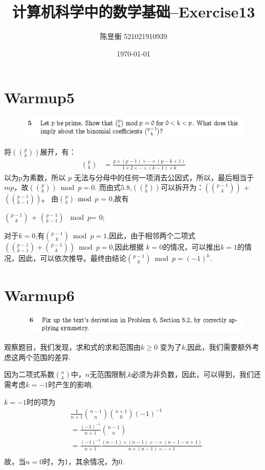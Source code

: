 \documentclass[]{article}
\title{计算机科学中的数学基础--Exercise13}
\author{陈昱衡 521021910939}
\date{\today}
\begin{document}
\maketitle


\section*{Warmup5}
\begin{figure}[H]
    
    \includegraphics[scale = 0.6]{2023-03-27-17-10-45.png}
\end{figure}
将$\left( \binom{p}{k}\right)$展开，有：
\begin{align}
    \binom{p}{k}&=\frac{p \times (p-1) \times \cdots \times (p-k+1)}{1 \times 2 \times \cdots \times  (k-1) \times k}  
\end{align}
以为p为素数，所以 $p$ 无法与分母中的任何一项消去公因式，所以，最后相当于$mp$，故$\left( \binom{p}{k}\right) \bmod p = 0$.
而由式5.8,$\left( \binom{p}{k}\right)$可以拆开为：$\left( \binom{p - 1}{k}\right)$ + $\left( \binom{p - 1}{k - 1}\right)$。
由$\binom{p}{k}$ $\bmod$ $p$ = 0,故有

$\binom{p - 1}{k}$ + $ \binom{p - 1}{k - 1}$ $\bmod p $= 0;
\par 
对于$k=0$,有$\binom{p-1}{k} \bmod p = 1$,因此，由于相邻两个二项式$(\binom{p-1}{k-1} + \binom{p-1}{k}) \bmod p = 0$,因此根据 $k=0$的情况，可以推出$k=1$的情况，因此，可以依次推导。最终由结论$\binom{p-1}{k} \bmod p = (-1)^k$.
\par 



\section*{Warmup6}

\begin{figure}[H]
    
    \includegraphics[scale = 0.6]{2023-03-27-17-12-02.png}
\end{figure}
观察题目，我们发现，求和式的求和范围由$k \ge 0$ 变为了$k$,因此，我们需要额外考虑这两个范围的差异.\par 
因为二项式系数$\binom{n}{k}$中，$n$无范围限制,$k$必须为非负数，因此，可以得到，我们还需考虑$k=-1$时产生的影响.\par 
$k=-1$时的项为
\begin{align}
    &\frac{1}{n+1}\binom{n-1}{n}\binom{n+1}{0}(-1)^{-1}\\
    &=\frac{(-1)^{-1}}{n+1}\binom{n-1}{n}\\
    &=\frac{(-1)^{-1}}{n+1}\frac{(n-1) \times (n-1) \times \cdots \times (n-1 - n + 1)}{n \times (n-1) \times \cdots \times 1}\\
\end{align}
故，当$n=0$时，为1，其余情况，为0.
\end{document}
